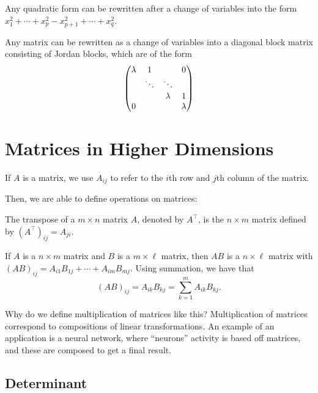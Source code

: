 \begin{theorem}
    Any quadratic form can be rewritten after a change of variables into the form $x_1^2 + \cdots + x_p^2 - x_{p + 1}^2 + \cdots + x_q^2$.
\end{theorem}

\begin{theorem}
    
\end{theorem}

\begin{theorem}
    Any matrix can be rewritten as a change of variables into a diagonal block matrix consisting of Jordan blocks, which are of the form \[\mqty(\lambda & 1 &  & 0\\
    & \ddots & \ddots & \\
    & & \lambda & 1 \\ 0 & & & \lambda )\]
\end{theorem}

\section{Matrices in Higher Dimensions}

If $A$ is a matrix, we use $A_{ij}$ to refer to the $i$th row and $j$th column of the matrix.

Then, we are able to define operations on matrices:

\begin{definition}[Transpose]
    The transpose of a $m \times n$ matrix $A$, denoted by $A^\top$, is the $n \times m$ matrix defined by $(A^\top)_{ij} = A_{ji}$.
\end{definition}

\begin{definition}[Multiplication]
    If $A$ is a $n \times m$ matrix and $B$ is a $m \times \ell$ matrix, then $AB$ is a $n \times \ell$ matrix with $(AB)_{ij} = A_{i1}B_{1j} + \cdots + A_{im}B_{mj}$. Using summation, we have that \[(AB)_{ij} = A_{ik}B_{kj} = \sum_{k = 1}^m A_{ik}B_{kj}.\]
\end{definition}

Why do we define multiplication of matrices like this? Multiplication of matrices correspond to compositions of linear transformations. An example of an application is a neural network, where ``neurons'' activity is based off matrices, and these are composed to get a final result.

\subsection{Determinant}

